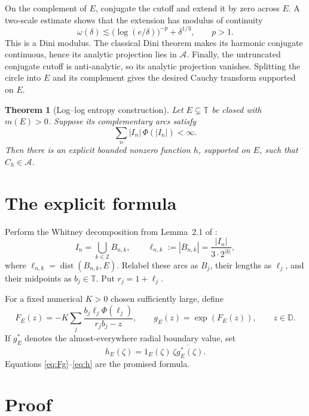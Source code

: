 \documentclass[11pt]{article}
\newtheorem{theorem}{Theorem}
\newcommand{\T}{\mathbb T}
\newcommand{\D}{\mathbb D}
\newcommand{\A}{\mathcal A}
\newcommand{\dist}{\operatorname{dist}}
\newcommand{\m}{m}
\begin{document}
On the complement of $E$, conjugate the cutoff and extend it by zero across
$E$.  A two-scale estimate shows that the extension has modulus of continuity
\[
 \omega(\delta)\lesssim
  \bigl(\log(e/\delta)\bigr)^{-p}+\delta^{1/3},
 \qquad p>1.
\]
This is a Dini modulus.  The classical Dini theorem makes its harmonic
conjugate continuous, hence its analytic projection lies in $\A$.  Finally,
the untruncated conjugate cutoff is anti-analytic, so its analytic projection
vanishes.  Splitting the circle into $E$ and its complement gives the desired
Cauchy transform supported on $E$.

\begin{theorem}[Log--log entropy construction]\label{thm:main}
Let $E\subsetneq\T$ be closed with $\m(E)>0$.  Suppose its complementary
arcs satisfy
\begin{equation}\label{eq:llentropy}
 \sum_n |I_n|\,\Phi(|I_n|)<\infty.
\end{equation}
Then there is an explicit bounded nonzero function $h$, supported on $E$,
such that $C_h\in\A$.
\end{theorem}

\section{The explicit formula}

Perform the Whitney decomposition from Lemma~2.1 of \cite{LM}:
\[
 I_n=\bigcup_{k\in\mathbb Z}B_{n,k},\qquad
 \ell_{n,k}:=|B_{n,k}|=\frac{|I_n|}{3\cdot2^{|k|}},
\]
where $\ell_{n,k}=\dist(B_{n,k},E)$.  Relabel these arcs as $B_j$, their
lengths as $\ell_j$, and their midpoints as $b_j\in\T$.  Put $r_j=1+\ell_j$.

For a fixed numerical $K>0$ chosen sufficiently large, define
\begin{equation}\label{eq:Fg}
 F_E(z)=-K\sum_j
 \frac{b_j\ell_j\Phi(\ell_j)}{r_jb_j-z},
 \qquad g_E(z)=\exp(F_E(z)),\qquad z\in\D.
\end{equation}
If $g_E^*$ denotes the almost-everywhere radial boundary value, set
\begin{equation}\label{eq:h}
 h_E(\zeta)=1_E(\zeta)\,
 \overline{\zeta g_E^*(\zeta)}.
\end{equation}
Equations \eqref{eq:Fg}--\eqref{eq:h} are the promised formula.

\section{Proof}
\end{document}
